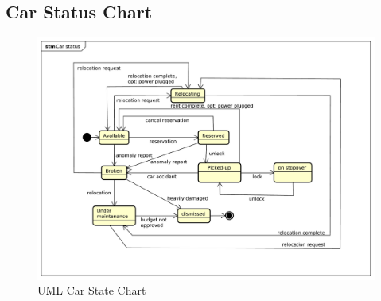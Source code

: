\documentclass[english]{article}
\begin{document}
	\noindent
		\\	
	\subsection{Car Status Chart}
	\begin{figure}[H]
		\centering
		\includegraphics[scale=0.3]{./uml/car_status.pdf}%
		\caption{UML Car State Chart}
	\end{figure}
\end{document}
